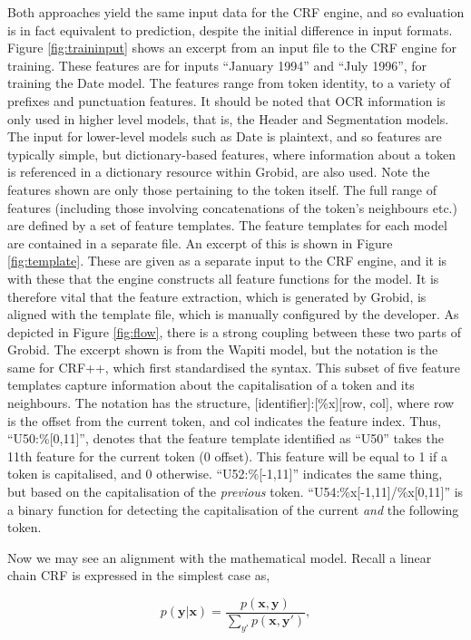 \documentclass[11pt, oneside]{scrartcl}   	%
\begin{document}
Both approaches yield the same input data for the CRF engine, and so evaluation is in fact equivalent to prediction, despite the initial difference in input formats. Figure \ref{fig:traininput} shows an excerpt from an input file to the CRF engine for training. These features are for inputs ``January 1994'' and ``July 1996'', for training the Date model. The features range from token identity, to a variety of prefixes and punctuation features. It should be noted that OCR information is only used in higher level models, that is, the Header and Segmentation models. The input for lower-level models such as Date is plaintext, and so features are typically simple, but dictionary-based features, where information about a token is referenced in a dictionary resource within Grobid, are also used. Note the features shown are only those pertaining to the token itself. The full range of features (including those involving concatenations of the token's neighbours etc.) are defined by a set of feature templates. The feature templates for each model are contained in a separate file. An excerpt of this is shown in Figure \ref{fig:template}. These are given as a separate input to the CRF engine, and it is with these that the engine constructs all feature functions for the model. It is therefore vital that the feature extraction, which is generated by Grobid, is aligned with the template file, which is manually configured by the developer. As depicted in Figure \ref{fig:flow}, there is a strong coupling between these two parts of Grobid. The excerpt shown is from the Wapiti model, but the notation is the same for CRF++, which first standardised the syntax. This subset of five feature templates capture information about the capitalisation of a token and its neighbours. The notation has the structure, [identifier]:[\%x][row, col], where row is the offset from the current token, and col indicates the feature index. Thus, ``U50:\%[0,11]'', denotes that the feature template identified as ``U50'' takes the 11th feature for the current token (0 offset). This feature will be equal to 1 if a token is capitalised, and 0 otherwise. ``U52:\%[-1,11]'' indicates the same thing, but based on the capitalisation of the \emph{previous} token. ``U54:\%x[-1,11]/\%x[0,11]'' is a binary function for detecting the capitalisation of the current \emph{and} the following token.

Now we may see an alignment with the mathematical model. Recall a linear chain CRF is expressed in the simplest case as,

\begin{equation}
p(\textbf{y}|\textbf{x}) = \frac{p(\textbf{x}, \textbf{y})}{\sum_{y'}{p(\textbf{x}, \textbf{y}')}},
\end{equation}
\end{document}
